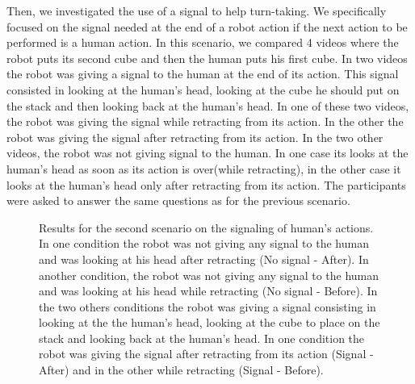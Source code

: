 \documentclass[english,a4paper,11pt,twoside]{StyleThese}
\begin{document}
Then, we investigated the use of a signal to help turn-taking. We specifically focused on the signal needed at the end of a robot action if the next action to be performed is a human action. In this scenario, we compared 4 videos where the robot puts its second cube and then the human puts his first cube. In two videos the robot was giving a signal to the human at the end of its action. This signal consisted in looking at the human's head, looking at the cube he should put on the stack and then looking back at the human's head. In one of these two videos, the robot was giving the signal while retracting from its action. In the other the robot was giving the signal after retracting from its action. In the two other videos, the robot was not giving signal to the human. In one case its looks at the human's head as soon as its action is over(while retracting), in the other case it looks at the human's head only after retracting from its action. The participants were asked to answer the same questions as for the previous scenario.

\begin{figure}[!h]
\centering
    \caption{Results for the second scenario on the signaling of human's actions. In one condition the robot was not giving any signal to the human and was looking at his head after retracting (No signal - After). In another condition, the robot was not giving any signal to the human and was looking at his head while retracting (No signal - Before). In the two others conditions the robot was giving a signal consisting in looking at the the human's head, looking at the cube to place on the stack and looking back at the human's head. In one condition the robot was giving the signal after retracting from its action (Signal - After) and in the other while retracting (Signal - Before).}
    \label{fig:resSce5}
\end{figure}
\end{document}
